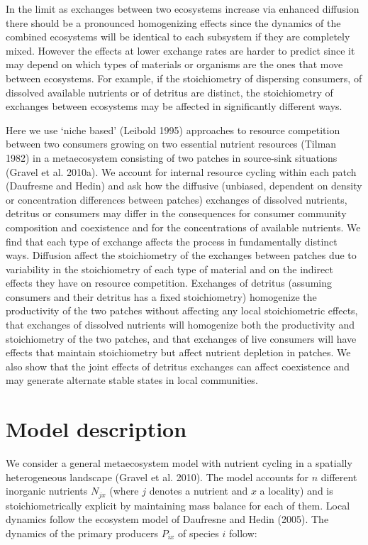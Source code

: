\documentclass[letterpaper,twocolumn,showkeys]{revtex4-1}
\begin{document}
In the limit as exchanges between two ecosystems increase via enhanced diffusion there should be a pronounced homogenizing effects since the dynamics of the combined ecosystems will be identical to each subsystem if they are completely mixed.  However the effects at lower exchange rates are harder to predict since it may depend on which types of materials or organisms are the ones that move between ecosystems.  For example, if the stoichiometry of dispersing consumers, of dissolved available nutrients or of detritus are distinct, the stoichiometry of exchanges between ecosystems may be affected  in significantly different ways.  

Here we use ‘niche based’ (Leibold 1995) approaches to resource competition between two consumers growing on two essential nutrient resources (Tilman 1982) in a metaecosystem consisting of two patches in source-sink situations (Gravel et al. 2010a).  We account for internal resource cycling within each patch (Daufresne and Hedin) and ask how the diffusive (unbiased, dependent on density or concentration differences between patches) exchanges of dissolved nutrients, detritus or consumers may differ in the consequences for consumer community composition and coexistence and for the concentrations of available nutrients.  We find that each type of exchange affects the process in fundamentally distinct ways. Diffusion affect the stoichiometry of the exchanges between patches due to variability in the stoichiometry of each type of material and on the indirect effects they have on resource competition.   Exchanges of detritus (assuming consumers and their detritus has a fixed stoichiometry) homogenize the productivity of the two patches without affecting any local stoichiometric effects, that exchanges of dissolved nutrients will homogenize both the productivity and stoichiometry of the two patches, and that exchanges of live consumers will have effects that maintain stoichiometry but affect nutrient depletion in patches.  We also show that the joint effects of detritus exchanges can affect coexistence and may generate alternate stable states in local communities. 



\section{Model description}
We consider a general metaecosystem model with nutrient cycling in a spatially heterogeneous landscape (Gravel et al. 2010). The model accounts for $n$ different inorganic nutrients $N_{jx}$ (where $j$ denotes a nutrient and $x$ a locality) and is stoichiometrically explicit by maintaining mass balance for each of them. Local dynamics follow the ecosystem model of Daufresne and Hedin (2005). The dynamics of the primary producers $P_{ix}$ of species $i$ follow:
\end{document}
